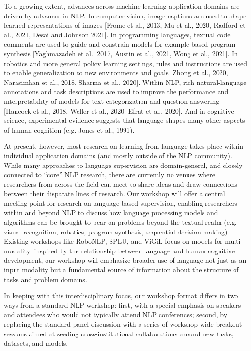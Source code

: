 To a growing extent, advances across machine learning application domains are driven by advances in NLP. In computer vision, image captions are used to shape learned representations of images [Frome et al., 2013, Mu et al., 2020, Radford et al., 2021, Desai and Johnson 2021]. In programming languages, textual code comments are used to guide and constrain models for example-based program synthesis [Yaghmazadeh et al., 2017, Austin et al., 2021, Wong et al., 2021]. In robotics and more general policy learning settings, rules and instructions are used to enable generalization to new environments and goals [Zhong et al., 2020, Narasimhan et al., 2018, Sharma et al., 2020]. Within NLP, rich natural-language annotations and task descriptions are used to improve the performance and interpretability of models for text categorization and question answering [Hancock et al., 2018, Weller et al., 2020, Efrat et al., 2020]. And in cognitive science, experimental evidence suggests that language shapes many other aspects of human cognition (e.g. Jones et al., 1991).

At present, however, most research on learning from language takes place within individual application domains (and mostly outside of the NLP community). While many approaches to language supervision are domain-general, and closely connected to “core” NLP research, there are currently no venues where researchers from across the field can meet to share ideas and draw connections between their disparate lines of research. Our workshop will offer a central meeting point for research on language-based supervision, enabling researchers within and beyond NLP to discuss how language processing models and algorithms can be brought to bear on problems beyond the textual realm (e.g. visual recognition, robotics, program synthesis, sequential decision making). Existing workshops like RoboNLP, SPLU, and ViGiL focus on models for multi-modality; inspired by the relationship between language and human cognitive development, our workshop will emphasize broader use of language not just as an input modality but a fundamental source of information about the structure of tasks and problem domains. 

In keeping with this interdisciplinary focus, our workshop format differs in two ways from a standard NLP workshop: first, with a special emphasis on speakers and attendees who would not typically attend NLP conferences; second, by replacing the standard panel discussion with a series of workshop-wide breakout sessions aimed at seeding cross-institutional collaborations around new tasks, datasets, and models.


